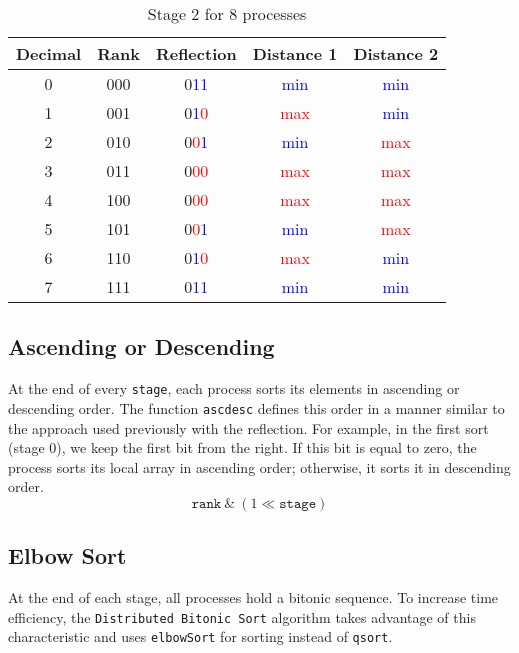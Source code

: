 \documentclass[12pt]{article}
\begin{document}
\begin{table}[h]
    \centering
    \begin{tabular}{|c|c|c|c|c|}
        \hline
        \textbf{Decimal} & \textbf{Rank} & \textbf{Reflection} & \textbf{Distance 1} & \textbf{Distance 2} \\ \hline
        0 & 000 & 0\textcolor{blue}{1}\textcolor{blue}{1} & \textcolor{blue}{min} & \textcolor{blue}{min} \\ \hline
        1 & 001 & 0\textcolor{blue}{1}\textcolor{red}{0} & \textcolor{red}{max} & \textcolor{blue}{min} \\ \hline
        2 & 010 & 0\textcolor{red}{0}\textcolor{blue}{1} & \textcolor{blue}{min} & \textcolor{red}{max} \\ \hline
        3 & 011 & 0\textcolor{red}{0}\textcolor{red}{0} & \textcolor{red}{max} & \textcolor{red}{max} \\ \hline
        4 & 100 & 0\textcolor{red}{0}\textcolor{red}{0} & \textcolor{red}{max} & \textcolor{red}{max} \\ \hline
        5 & 101 & 0\textcolor{red}{0}\textcolor{blue}{1} & \textcolor{blue}{min} & \textcolor{red}{max} \\ \hline
        6 & 110 & 0\textcolor{blue}{1}\textcolor{red}{0} & \textcolor{red}{max} & \textcolor{blue}{min} \\ \hline
        7 & 111 & 0\textcolor{blue}{1}\textcolor{blue}{1} & \textcolor{blue}{min} & \textcolor{blue}{min} \\ \hline
    \end{tabular}
    \caption{Stage 2 for 8 processes}
    \label{tab:xor}
\end{table}

\subsection{Ascending or Descending}
At the end of every \texttt{stage}, each process sorts its elements in ascending or descending order. The function \texttt{ascdesc} defines this order in a manner similar to the approach used previously with the reflection. For example, in the first sort (stage 0), we keep the first bit from the right. If this bit is equal to zero, the process sorts its local array in ascending order; otherwise, it sorts it in descending order.
\[\texttt{rank} \ \&  \ (1 \ll \texttt{stage})\]

\subsection{Elbow Sort}
At the end of each stage, all processes hold a bitonic sequence. To increase time efficiency, the \texttt{Distributed Bitonic Sort} algorithm takes advantage of this characteristic and uses \texttt{elbowSort} for sorting instead of \texttt{qsort}.
\end{document}
